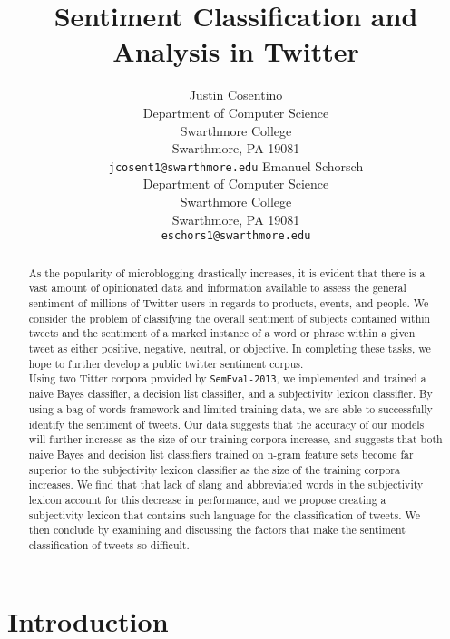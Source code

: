 \documentclass[11pt]{article}
\title{Sentiment Classification and Analysis in Twitter}
\author{Justin Cosentino\\
  Department of Computer Science\\
  Swarthmore College\\
  Swarthmore, PA 19081\\
  {\tt jcosent1@swarthmore.edu}  
  \And                            
  Emanuel Schorsch\\                 
  Department of Computer Science\\
  Swarthmore College\\
  Swarthmore, PA 19081\\
  {\tt eschors1@swarthmore.edu}}
\date{}
\begin{document}
\maketitle
\begin{abstract}
As the popularity of microblogging drastically increases, it is evident that there is a vast amount of opinionated data and information available to assess the general sentiment of millions of Twitter users in regards to products, events, and people. We consider the problem of classifying the overall sentiment of subjects contained within tweets and the sentiment of a marked instance of a word or phrase within a given tweet as either positive, negative, neutral, or objective. In completing these tasks, we hope to further develop a public twitter sentiment corpus.\\

Using two Titter corpora provided by {\tt SemEval-2013}, we implemented and trained a naive Bayes classifier, a decision list classifier, and a subjectivity lexicon classifier. By using a bag-of-words framework and limited training data, we are able to successfully identify the sentiment of tweets. Our data suggests that the accuracy of our models will further increase as the size of our training corpora increase, and suggests that both naive Bayes and decision list classifiers trained on n-gram feature sets become far superior to the subjectivity lexicon classifier as the size of the training corpora increases. We find that that lack of slang and abbreviated words in the subjectivity lexicon account for this decrease in performance, and we propose creating a subjectivity lexicon that contains such language for the classification of tweets. We then conclude by examining and discussing the factors that make the sentiment classification of tweets so difficult. 

\end{abstract}

\section{Introduction}
\end{document}
